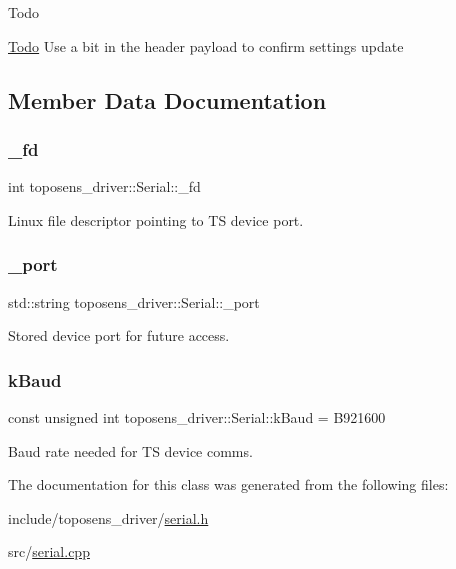 \begin{DoxyRefDesc}{Todo}
\item[\hyperlink{todo__todo000003}{Todo}]Use a bit in the header payload to confirm settings update \end{DoxyRefDesc}


\subsection{Member Data Documentation}
\mbox{\label{classtoposens__driver_1_1Serial_a7b3cfddd56ba457aa617737249e197fa}} 
\subsubsection{\texorpdfstring{\+\_\+fd}{\_fd}}
{\footnotesize\ttfamily int toposens\+\_\+driver\+::\+Serial\+::\+\_\+fd\hspace{0.3cm}{\ttfamily [private]}}

Linux file descriptor pointing to TS device port. \mbox{\label{classtoposens__driver_1_1Serial_a7625dc8f63340fc4ea3e076331c5552c}} 
\subsubsection{\texorpdfstring{\+\_\+port}{\_port}}
{\footnotesize\ttfamily std\+::string toposens\+\_\+driver\+::\+Serial\+::\+\_\+port\hspace{0.3cm}{\ttfamily [private]}}

Stored device port for future access. \mbox{\label{classtoposens__driver_1_1Serial_a383754d17418659020d9f7c221457f5f}} 
\subsubsection{\texorpdfstring{k\+Baud}{kBaud}}
{\footnotesize\ttfamily const unsigned int toposens\+\_\+driver\+::\+Serial\+::k\+Baud = B921600\hspace{0.3cm}{\ttfamily [private]}}

Baud rate needed for TS device comms. 

The documentation for this class was generated from the following files\+:\begin{DoxyCompactItemize}
\item 
include/toposens\+\_\+driver/\hyperlink{serial_8h}{serial.\+h}\item 
src/\hyperlink{serial_8cpp}{serial.\+cpp}\end{DoxyCompactItemize}
